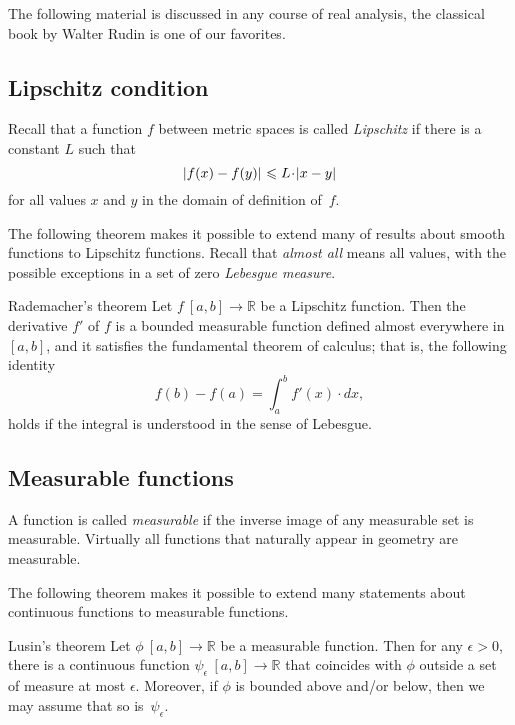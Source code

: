 The following material is discussed in any course of real analysis, the classical book by Walter Rudin \cite{rudin} is one of our favorites.

\subsection*{Lipschitz condition}

Recall that a function $f$ between metric spaces is called \emph{Lipschitz} if there is a constant $L$ such that 
\[\dist{f(x)}{f(y)}{}\le L\cdot\dist{x}{y}{}\]
for all values $x$ and $y$ in the domain of definition of~$f$.

The following theorem makes it possible to extend many of results about smooth functions to Lipschitz functions.
Recall that {}\emph{almost all} means all values, with the possible exceptions in a set of zero {}\emph{Lebesgue measure}.

\begin{thm}{Rademacher's theorem}\label{thm:rademacher}
Let $f\:[a,b]\to\mathbb{R}$ be a Lipschitz function.
Then the derivative $f'$ of $f$ is a bounded measurable function defined almost everywhere in $[a,b]$, and it satisfies the fundamental theorem of calculus; that is, the following identity 
\[f(b)-f(a)=\int_a^b f'(x)\cdot dx,\]
holds if the integral is understood in the sense of Lebesgue.
\end{thm}

\subsection*{Measurable functions}

A function is called \emph{measurable} if the inverse image of any measurable set is measurable.
Virtually all functions that naturally appear in geometry are measurable.

The following theorem makes it possible to extend many statements about continuous functions to measurable functions.

\begin{thm}{Lusin's theorem}\label{thm:lusin}
Let $\phi\:[a,b]\to \mathbb{R}$ be a measurable function.
Then for any $\epsilon>0$, there is a continuous function $\psi_\epsilon\:[a,b]\to \mathbb{R}$ that coincides with $\phi$ outside a set of measure at most $\epsilon$.
Moreover, if $\phi$ is bounded above and/or below, then we may assume that so is~$\psi_\epsilon$.  
\end{thm}

